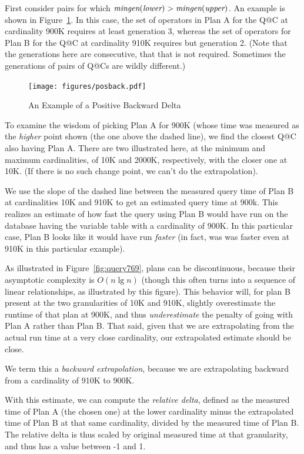 \documentclass[prodmode,acmtods]{acmsmall}
\begin{document}
First consider pairs for which $\hbox{\em
mingen}(\hbox{\em lower}) > \hbox{\em mingen}(\hbox{\em
  upper})$. An example is shown in Figure~\ref{fig:posback}. In this case,
the set of operators in Plan A for the Q@C at cardinality 900K requires at
least generation 3, whereas the set of operators for Plan B for the Q@C at
cardinality 910K requires but generation 2. (Note that the generations here
are consecutive, that that is not required. Sometimes the generations of
pairs of Q@Cs are wildly different.)

\begin{figure}[t]
\texttt{[image: figures/posback.pdf]}
\caption{An Example of a Positive Backward Delta\label{fig:posback}}
\end{figure}

To examine the wisdom of picking Plan A for 900K (whose time was measured as
the {\em higher} point shown (the one above the dashed line), we find the closest Q@C
also having Plan A. There are two illustrated here, at the minimum and
maximum cardinalities, of 10K and 2000K, respectively, with the closer one
at 10K. (If there is no such change
point, we can't do the extrapolation).

We use the slope of the dashed line between the measured query time of Plan
B at cardinalities 10K and 910K to get an estimated query time at 900k.
This realizes an estimate of how fast the query using Plan B would have run
on the database having the variable table with a cardinality of 900K. In
this particular case, Plan B looks like it would have run {\em faster} (in
fact, was was faster even at 910K in this particular example).

As illustrated in Figure~\ref{fig:query769}, plans can be discontinuous,
because their asymptotic complexity is $O(n \lg n)$ (though this often turns into
a sequence of linear relationships, as illustrated by this
figure). This behavior will, for plan B present at
the two granularities of 10K and 910K, slightly overestimate the runtime of
that plan at 900K, and thus {\em underestimate} the penalty of going with
Plan A rather than Plan B. That said,
given that we are extrapolating from the actual run time at a very
close cardinality, our extrapolated estimate should be close.

We term this a {\em backward extrapolation}, because we are extrapolating
backward from a cardinality of 910K to 900K.

With this estimate, we can compute the {\em relative delta}, defined as the
measured time of Plan A (the chosen one) at the lower cardinality minus the
extrapolated time of Plan B at that same cardinality, divided by the
measured time of Plan B. The relative delta is thus scaled by original
measured time at that granularity, and thus has a value between -1 and 1.
\end{document}
